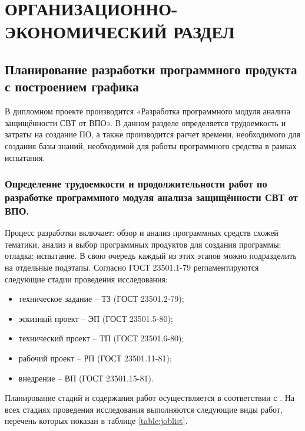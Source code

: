 \section {ОРГАНИЗАЦИОННО-ЭКОНОМИЧЕСКИЙ РАЗДЕЛ}
\subsection {Планирование разработки программного продукта с построением графика}
В дипломном проекте производится «Разработка программного модуля анализа защищённости СВТ от ВПО». В данном разделе определяется трудоемкость и затраты на создание ПО, а также производится расчет времени, необходимого для создания базы знаний, необходимой для работы программного средства в рамках испытания. 
\subsubsection {Определение трудоемкости и продолжительности работ по разработке программного модуля анализа защищённости СВТ от ВПО.}
Процесс разработки включает: обзор и анализ программных средств схожей тематики, анализ и выбор программных продуктов для создания программы; отладка; испытание. В свою очередь каждый из этих этапов можно подразделить на отдельные подэтапы.
Согласно ГОСТ 23501.1-79 регламентируются следующие стадии проведения исследования:
\begin {itemize}
	\item техническое задание – ТЗ (ГОСТ 23501.2-79);
	\item эскизный проект – ЭП (ГОСТ 23501.5-80);
	\item технический проект – ТП (ГОСТ 23501.6-80);
	\item рабочий проект – РП (ГОСТ 23501.11-81);
	\item внедрение – ВП (ГОСТ 23501.15-81).
\end {itemize}

Планирование стадий и содержания работ осуществляется в соответствии с \cite {ECONOMICS}. На всех стадиях проведения исследования выполняются следующие виды работ, перечень которых показан в таблице \ref {table:joblist}.

